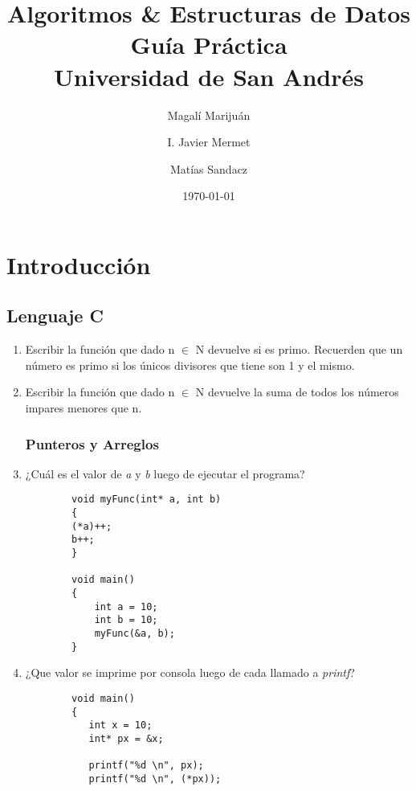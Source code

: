 \documentclass[titlepage,oneside]{book}
\title{
	Algoritmos \& Estructuras de Datos\\
	\large Guía Práctica \\
	\large Universidad de San Andrés
}
\author{Magalí Marijuán\\
	\and
	I. Javier Mermet
	\and
	Matías Sandacz
}
\date{\today}
\begin{document}
\maketitle
\tableofcontents

\part{Introducción}
\chapter{Lenguaje C}

\begin{enumerate}

    \section{Introductorios}

    \item Escribir la función que dado n $\in$ N devuelve si es primo. Recuerden que un número es primo si los únicos divisores que tiene son 1 y el mismo.
    
    \item Escribir la función que dado n $\in$ N devuelve la suma de todos los números impares menores que n.

    \section{Punteros y Arreglos}

    \item ¿Cuál es el valor de \textit{a} y \textit{b} luego de ejecutar el programa?
    \begin{verbatim}
        void myFunc(int* a, int b)
        {
        (*a)++;
        b++;
        }

        void main()
        {
            int a = 10;
            int b = 10;
            myFunc(&a, b);
        }
    \end{verbatim}

    \item ¿Que valor se imprime por consola luego de cada llamado a \textit{printf}?
    \begin{verbatim}
        void main()
        {
           int x = 10;
           int* px = &x;
    
           printf("%d \n", px);
           printf("%d \n", (*px));
    

\end{verbatim}
\end{enumerate}
\end{document}
